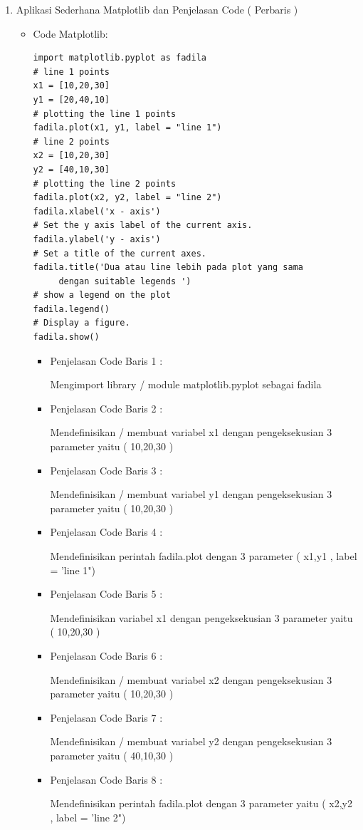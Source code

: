 \begin{enumerate}
\par
\par
\item Aplikasi Sederhana Matplotlib dan Penjelasan Code ( Perbaris )
\begin{itemize}
\item Code Matplotlib:
\begin{lstlisting}
import matplotlib.pyplot as fadila
# line 1 points
x1 = [10,20,30]
y1 = [20,40,10]
# plotting the line 1 points 
fadila.plot(x1, y1, label = "line 1")
# line 2 points
x2 = [10,20,30]
y2 = [40,10,30]
# plotting the line 2 points 
fadila.plot(x2, y2, label = "line 2")
fadila.xlabel('x - axis')
# Set the y axis label of the current axis.
fadila.ylabel('y - axis')
# Set a title of the current axes.
fadila.title('Dua atau line lebih pada plot yang sama 
	 dengan suitable legends ')
# show a legend on the plot
fadila.legend()
# Display a figure.
fadila.show()
\end{lstlisting}
\par
\begin{itemize}
\item Penjelasan Code Baris 1 :
\par Mengimport library / module matplotlib.pyplot sebagai fadila
\item Penjelasan Code Baris 2 :
\par Mendefinisikan / membuat variabel x1  dengan pengeksekusian 3 parameter yaitu ( 10,20,30 )
\item Penjelasan Code Baris 3 :
\par Mendefinisikan / membuat  variabel y1  dengan pengeksekusian 3 parameter yaitu ( 10,20,30 )
\item Penjelasan Code Baris 4 :
\par Mendefinisikan perintah fadila.plot dengan 3 parameter ( x1,y1 , label = 'line 1")
\item Penjelasan Code Baris 5 :
\par Mendefinisikan variabel x1  dengan pengeksekusian 3 parameter yaitu ( 10,20,30 )
\item Penjelasan Code Baris 6 :
\par Mendefinisikan / membuat  variabel x2  dengan pengeksekusian 3 parameter yaitu ( 10,20,30 )
\item Penjelasan Code Baris 7 :
\par Mendefinisikan / membuat  variabel y2  dengan pengeksekusian 3 parameter yaitu ( 40,10,30 )
\item Penjelasan Code Baris 8 :
\par Mendefinisikan perintah fadila.plot dengan 3 parameter yaitu ( x2,y2 , label = 'line 2")

\end{itemize}
\end{itemize}
\end{enumerate}
